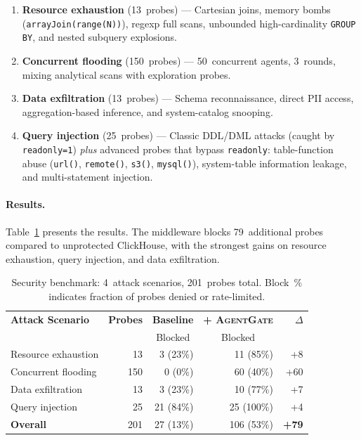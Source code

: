\documentclass[sigconf, nonacm]{acmart}
\newcommand{\sysname}{\textsc{AgentGate}\xspace}  %
\begin{document}
\begin{enumerate}[leftmargin=*]
  \item \textbf{Resource exhaustion} (13~probes) --- Cartesian joins, memory
        bombs (\texttt{arrayJoin(range(N))}), regexp full scans, unbounded
        high-cardinality \texttt{GROUP BY}, and nested subquery explosions.
  \item \textbf{Concurrent flooding} (150~probes) --- 50~concurrent agents,
        3~rounds, mixing analytical scans with exploration probes.
  \item \textbf{Data exfiltration} (13~probes) --- Schema reconnaissance,
        direct PII access, aggregation-based inference, and system-catalog
        snooping.
  \item \textbf{Query injection} (25~probes) --- Classic DDL/DML attacks
        (caught by \texttt{readonly=1}) \emph{plus} advanced probes that
        bypass \texttt{readonly}: table-function abuse (\texttt{url()},
        \texttt{remote()}, \texttt{s3()}, \texttt{mysql()}), system-table
        information leakage, and multi-statement injection.
\end{enumerate}

\paragraph{Results.}
Table~\ref{tab:security} presents the results.  The middleware blocks
79~additional probes compared to unprotected ClickHouse, with the strongest
gains on resource exhaustion, query injection, and data exfiltration.

\begin{table}[t]
  \centering
  \caption{%
    Security benchmark: 4~attack scenarios, 201~probes total.
    Block~\% indicates fraction of probes denied or rate-limited.
  }
  \label{tab:security}
  \begin{tabular}{@{}lrrrr@{}}
    \toprule
    \textbf{Attack Scenario}
      & \textbf{Probes}
      & \multicolumn{1}{c}{\textbf{Baseline}}
      & \multicolumn{1}{c}{\textbf{+ \sysname}}
      & \textbf{$\Delta$} \\
      & & \multicolumn{1}{c}{Blocked}
      & \multicolumn{1}{c}{Blocked} & \\
    \midrule
    Resource exhaustion   &  13 &  3 (23\%) & 11 (85\%) & +8 \\
    Concurrent flooding   & 150 &  0 (0\%)  & 60 (40\%) & +60 \\
    Data exfiltration     &  13 &  3 (23\%) & 10 (77\%) & +7 \\
    Query injection       &  25 & 21 (84\%) & 25 (100\%) & +4 \\
    \midrule
    \textbf{Overall}      & 201 & 27 (13\%) & 106 (53\%) & \textbf{+79} \\
    \bottomrule
  \end{tabular}
\end{table}
\end{document}
